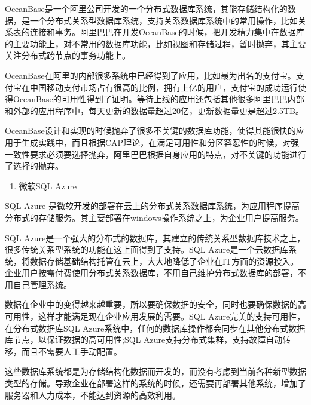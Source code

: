 	
	OceanBase是一个阿里公司开发的一个分布式数据库系统，其能存储结构化的数据，是一个分布式关系型数据库系统，支持关系数据库系统中的常用操作，比如关系表的连接和事务。阿里巴巴在开发OceanBase的时候，把开发精力集中在数据库的主要功能上，对不常用的数据库功能，比如视图和存储过程，暂时抛弃，其主要关注分布式跨节点的事务功能上。
	
	OceanBase在阿里的内部很多系统中已经得到了应用，比如最为出名的支付宝。支付宝在中国移动支付市场占有很高的比例，拥有上亿的用户，支付宝的成功运行使得OceanBase的可用性得到了证明。等待上线的应用还包括其他很多阿里巴巴内部和外部的应用程序中，每天更新的数据量超过20亿，更新数据量更是超过2.5TB。
	
	OceanBase设计和实现的时候抛弃了很多不关键的数据库功能，使得其能很快的应用于生成实践中，而且根据CAP理论，在满足可用性和分区容忍性的时候，对强一致性要求必须要选择抛弃，阿里巴巴根据自身应用的特点，对不关键的功能进行了选择的抛弃。
	
	\begin{enumerate}[resume]
		\item 微软SQL Azure
	\end{enumerate}
	
	
	SQL Azure 是微软开发的部署在云上的分布式关系数据库系统，为应用程序提高分布式的存储服务。其主要部署在windows操作系统之上，为企业用户提高服务。
	
	SQL Azure是一个强大的分布式的数据库，其建立的传统关系型数据库技术之上，很多传统关系型系统的功能在这上面得到了支持。SQL Azure是一个云数据库系统，将数据存储基础结构托管在云上，大大地降低了企业在IT方面的资源投入。企业用户按需付费使用分布式关系数据库，不用自己维护分布式数据库的部署，不用自己管理系统。
	
	数据在企业中的变得越来越重要，所以要确保数据的安全，同时也要确保数据的高可用性，这样才能满足现在企业应用发展的需要。SQL Azure完美的支持可用性，在分布式数据库SQL Azure系统中，任何的数据库操作都会同步在其他分布式数据库节点，以保证数据的高可用性;SQL Azure支持分布式集群，支持故障自动转移，而且不需要人工手动配置。
	
	这些数据库系统都是为存储结构化数据而开发的，而没有考虑到当前各种新型数据类型的存储。导致企业在部署这样的系统的时候，还需要再部署其他系统，增加了服务器和人力成本，不能达到资源的高效利用。
